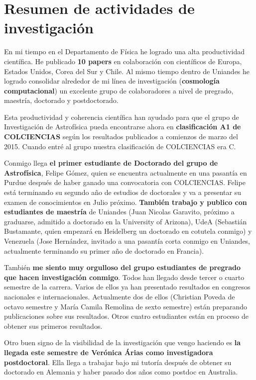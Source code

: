 \documentclass[letterpaper,12pt,onecolumn]{article}
\begin{document}
\pagestyle{empty}
\section*{{\Large{\sc Resumen de actividades de investigaci\'on}}}

En mi tiempo en el Departamento de F\'isica he logrado una alta
productividad cient\'ifica. He publicado {\bf 10 papers} en colaboraci\'on
con cient\'ificos de Europa, Estados Unidos, Corea del Sur y Chile. Al
mismo tiempo dentro de Uniandes he logrado consolidar alrededor de mi
l\'inea de investigaci\'on ({\bf cosmolog\'ia computacional}) un excelente
grupo de colaboradores a nivel de pregrado, maestr\'ia, doctorado y
postdoctorado.  

Esta productividad y coherencia cient\'ifica han ayudado para que el grupo de
Investigaci\'on de Astrof\'isica pueda encontrarse ahora en {\bf clasificaci\'on
A1 de COLCIENCIAS} seg\'un los resultados publicados a comienzos de marzo del
2015. Cuando entr\'e al grupo nuestra clasificaci\'on de COLCIENCIAS era C.   

Conmigo llega {\bf el primer estudiante de Doctorado del grupo de Astrof\'isica}, Felipe
G\'omez, quien se encuentra actualmente en una pasant\'ia en Purdue
despu\'es de haber ganado una convocatoria con COLCIENCIAS. Felipe
est\'a terminando su segundo a\~no de estudios de doctorales y va a
presentar su examen de conocimientos en Julio pr\'oximo. {\bf Tambi\'en
trabajo y publico con estudiantes de maestr\'ia} de Uniandes (Juan
Nicolas Garavito, pr\'oximo a graduarse, admitido a doctorado en la
University of Arizona), UdeA (Sebasti\'an
Bustamante, quien empezar\'a en Heidelberg un doctorado en cotutela conmigo)
y Venezuela (Jose Hern\'andez, invitado a una pasant\'ia corta conmigo
en Uniandes, actualmente terminando su primer a\~no de doctorado en
Francia).   

Tambi\'en {\bf me siento muy orgulloso del grupo estudiantes de pregrado que
hacen investigaci\'on conmigo}. Todos han llegado desde tercer o cuarto
semestre de la carrera. Varios de ellos ya han presentado resultados
en congresos nacionales e internacionales. Actualmente dos de ellos
(Christian Poveda de octavo semestre y Mar\'ia Camila Remolina de
sexto semestre) est\'an preparando publicaciones sobre sus
resultados. Otros cuatro estudiantes est\'an en proceso de obtener sus
primeros resultados.  

Otro buen signo de la visibilidad de la investigaci\'on que vengo
haciendo es {\bf la llegada este semestre de Ver\'onica \'Arias como 
investigadora postdoctoral}. Ella llega a trabajar bajo mi
tutor\'ia despu\'es de obtener su doctorado en Alemania y haber pasado
dos a\~nos como postdoc en Australia. 
\end{document}
